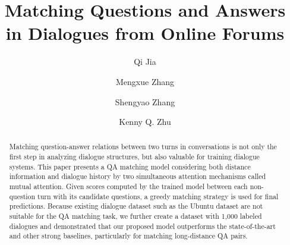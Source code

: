 \documentclass{ecai}
\begin{document}
\title{Matching Questions and Answers in Dialogues from Online Forums}

\author{Qi Jia  \and Mengxue Zhang  \and Shengyao Zhang  \and Kenny Q. Zhu  }

\maketitle


\begin{abstract}
 Matching question-answer relations between two turns in conversations is not only 
 the first step in analyzing dialogue structures, 
 but also valuable for training dialogue systems. 
 This paper presents a QA matching model considering both 
 distance information and dialogue history by two simultaneous attention 
 mechanisms called mutual attention. 
 Given scores computed by the trained model between each non-question 
 turn with its candidate questions, a greedy matching strategy 
 is used for final predictions. 
 Because existing dialogue dataset such as the Ubuntu dataset are not 
 suitable for the QA matching task, we further create a dataset with 
 1,000 labeled dialogues and 
 demonstrated that our proposed model outperforms the state-of-the-art and 
 other strong baselines, particularly for
 matching long-distance QA pairs.
\end{abstract}






















\end{document}
